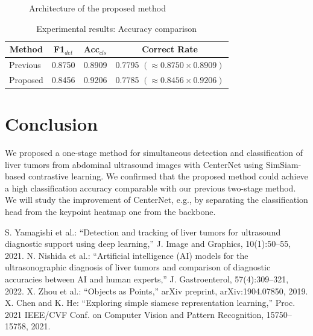 \documentclass[conference]{IEEEtran}
\begin{document}
\begin{figure}[t]
\begin{minipage}[t]{.6\linewidth}
                \label{fig:centernet}
            \end{minipage}
            \caption{Architecture of the proposed method}
            \label{fig:architecture}
        \end{figure}

        \begin{table}[t]
            \centering
            \caption{Experimental results: Accuracy comparison}
            \label{tab:metric_center_stepwise}
            \begin{tabular}{l|cc|c} \hline
                \multicolumn{1}{c|}{Method} & F1$_{det}$ & Acc$_{cls}$ & Correct Rate \\ \hline
                Previous\cite{prestudy_det,prestudy_cls} & 0.8750 & 0.8909 & 0.7795 $(\approx 0.8750 \times 0.8909)$ \\
                Proposed & 0.8456 & 0.9206 & 0.7785 $(\approx 0.8456 \times 0.9206)$ \\ \hline
            \end{tabular}
        \end{table}

    \section{Conclusion}
        We proposed a one-stage method for simultaneous detection and classification of liver tumors from abdominal ultrasound images with CenterNet using SimSiam-based contrastive learning.
        We confirmed that the proposed method could achieve a high classification accuracy comparable with our previous two-stage method.
        We will study the improvement of CenterNet, e.g., by separating the classification head from the keypoint heatmap one from the backbone.

    \begin{thebibliography}{9}
         S. Yamagishi et al.: ``Detection and tracking of liver tumors for ultrasound diagnostic support using deep learning,'' J. Image and Graphics, 10(1):50--55, 2021.
         N. Nishida et al.: ``Artificial intelligence (AI) models for the ultrasonographic diagnosis of liver tumors and comparison of diagnostic accuracies between AI and human experts,'' J. Gastroenterol, 57(4):309--321, 2022.
         X. Zhou et al.: ``Objects as Points,'' arXiv preprint, arXiv:1904.07850, 2019.
         X. Chen and K. He: ``Exploring simple siamese representation learning,'' Proc. 2021 IEEE/CVF Conf. on Computer Vision and Pattern Recognition, 15750--15758, 2021.
    \end{thebibliography}
\end{document}
